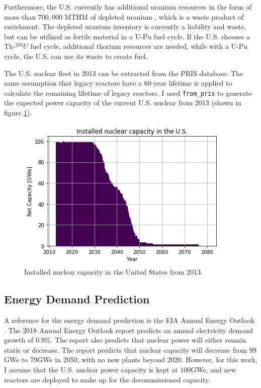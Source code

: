 Furthermore, the U.S. currently has additional uranium resources in the
form of more than $700,000$ MTHM of depleted uranium \cite{office_nuclear_2011},
which is a waste product of enrichment. The depleted uranium inventory
is currently a liability and waste, but can be utilized as fertile material
in a U-Pu fuel cycle. If the U.S. chooses a Th-$^{233}U$ fuel cycle,
additional thorium resources are needed, while with a U-Pu cycle, the
U.S. can use its waste to create fuel.

The U.S. nuclear fleet in 2013 can be extracted from the \gls{PRIS} database.
The same assumption that legacy reactors have a 60-year lifetime is applied
to calculate the remaining lifetime of legacy reactors.
I used \texttt{from\_pris} to generate the expected power capacity
of the current U.S. nuclear from 2013 (shown in figure \ref{fig:us_legacy}).

\begin{figure}[htbp!]
	\begin{center}
		\includegraphics[scale=0.7]{./images/us/legacy_power.png}
	\end{center}
	\caption{Installed nuclear capacity in the United States from 2013.}
	\label{fig:us_legacy}
\end{figure}


\subsection{Energy Demand Prediction}
A reference for the energy demand prediction is the 
\gls{EIA} Annual Energy Outlook \cite{u.s._eia_annual_2018}.
The 2018 Annual Energy Outlook report predicts an annual electricity demand growth
of 0.9\%. The report also predicts that nuclear
power will either remain static or decrease. The report
predicts that nuclear capacity will decrease from 99 GWe
to 79GWe in 2050, with no new plants beyond 2020.
However, for this work,
I assume that the U.S. nuclear power capacity is kept at
100GWe, and new reactors are deployed to make up for the
decommissioned capacity.

